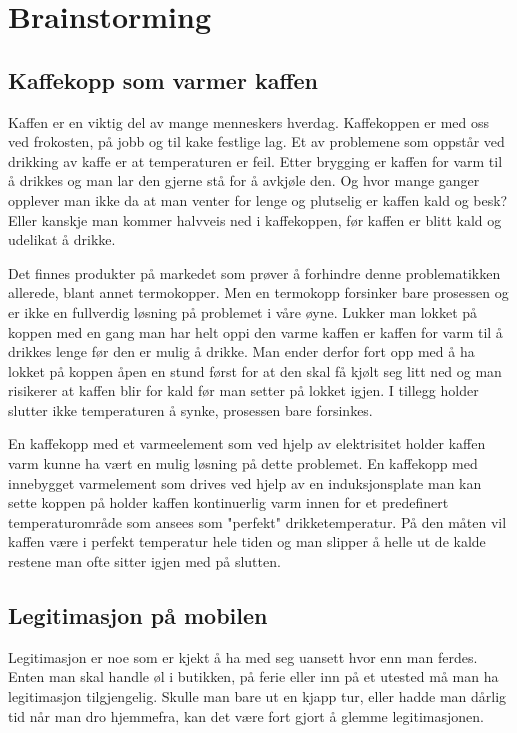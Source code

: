 \chapter{Brainstorming}
\section{Kaffekopp som varmer kaffen}
Kaffen er en viktig del av mange menneskers hverdag. Kaffekoppen er med oss ved frokosten, på jobb og til kake festlige lag. Et av problemene som oppstår ved drikking av kaffe er at temperaturen er feil. Etter brygging er kaffen for varm til å drikkes og man lar den gjerne stå for å avkjøle den. Og hvor mange ganger opplever man ikke da at man venter for lenge og plutselig er kaffen kald og besk? Eller kanskje man kommer halvveis ned i kaffekoppen, før kaffen er blitt kald og udelikat å drikke.

Det finnes produkter på markedet som prøver å forhindre denne problematikken allerede, blant annet termokopper. Men en termokopp forsinker bare prosessen og er ikke en fullverdig løsning på problemet i våre øyne. Lukker man lokket på koppen med en gang man har helt oppi den varme kaffen er kaffen for varm til å drikkes lenge før den er mulig å drikke. Man ender derfor fort opp med å ha lokket på koppen åpen en stund først for at den skal få kjølt seg litt ned og man risikerer at kaffen blir for kald før man setter på lokket igjen. I tillegg holder slutter ikke temperaturen å synke, prosessen bare forsinkes.

En kaffekopp med et varmeelement som ved hjelp av elektrisitet holder kaffen varm kunne ha vært en mulig løsning på dette problemet. En kaffekopp med innebygget varmelement som drives ved hjelp av en induksjonsplate man kan sette koppen på holder kaffen kontinuerlig varm innen for et predefinert temperaturområde som ansees som "perfekt" drikketemperatur. På den måten vil kaffen være i perfekt temperatur hele tiden og man slipper å helle ut de kalde restene man ofte sitter igjen med på slutten.


\section{Legitimasjon på mobilen}
Legitimasjon er noe som er kjekt å ha med seg uansett hvor enn man ferdes. Enten man skal handle øl i butikken, på ferie eller inn på et utested må man ha legitimasjon tilgjengelig. Skulle man bare ut en kjapp tur, eller hadde man dårlig tid når man dro hjemmefra, kan det være fort gjort å glemme legitimasjonen.

